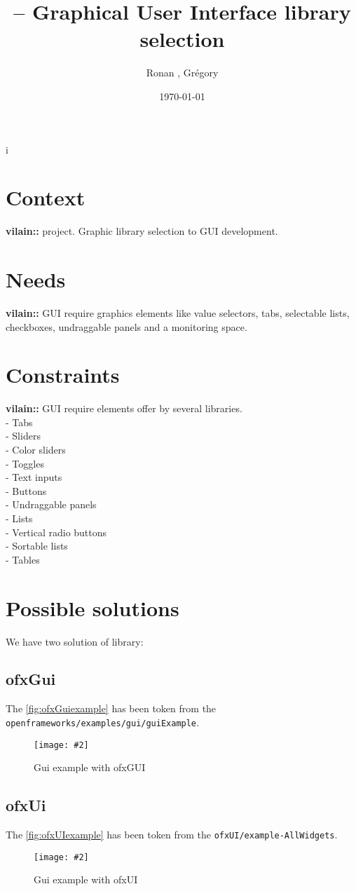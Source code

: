 i\documentclass[a4paper,titlepage,oneside]{article}
\author{Ronan \bsc{Legardinier}, Grégory \bsc{David}}
\title{\vilain{} -- Graphical User Interface library selection}
\date{\today{}}
\newcommand{\image}[5][\textwidth]{%
    \begin{figure}[h]
        \centering
            \begin{minipage}[c]{#1}
                \centering
                \texttt{[image: \#2]}
                \caption{#4}
                \label{#5}
            \end{minipage}
    \end{figure}
}
\newcommand{\vilain}{\textbf{vilain::}}
\begin{document}
\maketitle{}
\tableofcontents{}
\newpage
	
\section{Context}
\vilain{} project. Graphic library selection to GUI development.

\section{Needs}
\vilain{} GUI require graphics elements like value selectors, tabs,
selectable lists, checkboxes, undraggable panels and a monitoring
space.

\section{Constraints}
\vilain{} GUI require elements offer by several libraries.\\
- Tabs\\
- Sliders\\
- Color sliders\\
- Toggles\\
- Text inputs\\
- Buttons\\
- Undraggable panels\\
- Lists\\
- Vertical radio buttons\\
- Sortable lists\\
- Tables

\section{Possible solutions}
We have two solution of library:
\subsection{ofxGui}
The \figurename \vref{fig:ofxGuiexample} has been token from the
\texttt{openframeworks/examples/gui/guiExample}.
\image{data/ofxGui.jpg}{width=13cm}{Gui example with
  ofxGUI}{fig:ofxGuiexample}
			
\subsection{ofxUi}
The \figurename \vref{fig:ofxUIexample} has been token from the
\texttt{ofxUI/example-AllWidgets}.
\image{data/ofxUI.jpg}{width=13cm}{Gui example with
  ofxUI}{fig:ofxUIexample}
								
\end{document}

